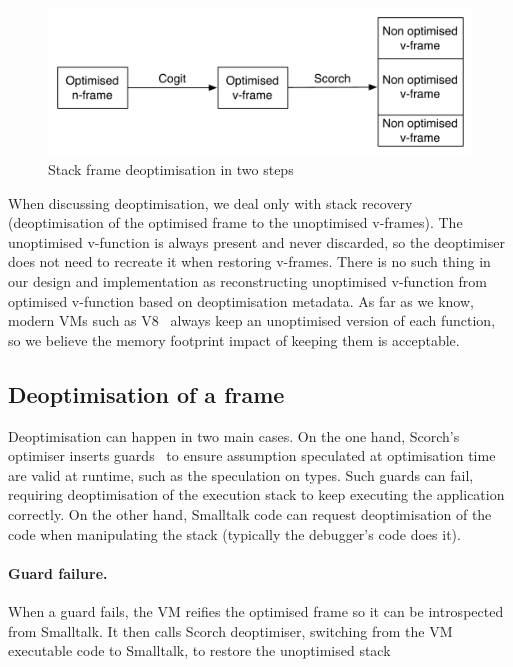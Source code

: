 \documentclass[a4paper,12pt,twoside]{../includes/ThesisStyle}
\begin{document}
\begin{figure}[h!]
    \begin{center}
        \includegraphics[width=0.8\linewidth]{SFDeoptimisation}
        \caption{Stack frame deoptimisation in two steps}
        \label{fig:SFDeoptimisation}
    \end{center}
\end{figure}

When discussing deoptimisation, we deal only with stack recovery (deoptimisation of the optimised frame to the unoptimised v-frames). The unoptimised v-function is always present and never discarded, so the deoptimiser does not need to recreate it when restoring v-frames. There is no such thing in our design and implementation as reconstructing unoptimised v-function from optimised v-function based on deoptimisation metadata. As far as we know, modern VMs such as V8~\cite{V8} always keep an unoptimised version of each function, so we believe the memory footprint impact of keeping them is acceptable.

\subsection{Deoptimisation of a frame}

Deoptimisation can happen in two main cases. On the one hand, Scorch's optimiser inserts guards~\cite{Holz92a} to ensure assumption speculated at optimisation time are valid at runtime, such as the speculation on types. Such guards can fail, requiring deoptimisation of the execution stack to keep executing the application correctly. On the other hand, Smalltalk code can request deoptimisation of the code when manipulating the stack (typically the debugger's code does it).

\paragraph{Guard failure.} When a guard fails, the VM reifies the optimised frame so it can be introspected from Smalltalk. It then calls Scorch deoptimiser, switching from the VM executable code to Smalltalk, to restore the unoptimised stack
\end{document}
